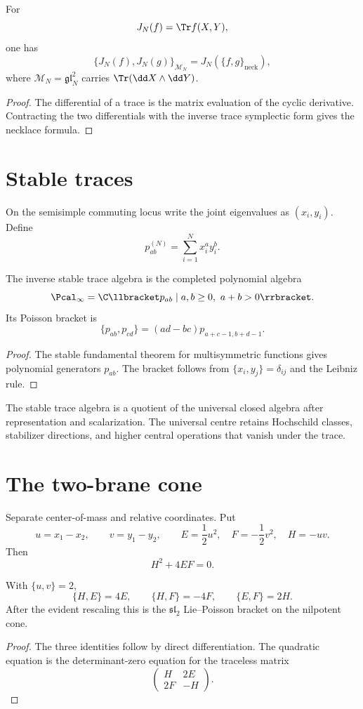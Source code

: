\begin{theorem}
For
\[
 J_N(f)=\Tr f(X,Y),
\]
one has
\[
 \{J_N(f),J_N(g)\}_{\mathcal M_N}
 =J_N\!\left(\{f,g\}_{\mathrm{neck}}\right),
\]
where $\mathcal M_N=\mathfrak{gl}_N^2$ carries $\Tr(\dd X\wedge\dd Y)$.
\end{theorem}
\begin{proof}
The differential of a trace is the matrix evaluation of the cyclic derivative.  Contracting the two differentials with the inverse trace symplectic form gives the necklace formula.
\end{proof}

\chapter{Stable traces}
On the semisimple commuting locus write the joint eigenvalues as $(x_i,y_i)$.  Define
\[
 p_{ab}^{(N)}=\sum_{i=1}^{N}x_i^ay_i^b.
\]

\begin{theorem}
The inverse stable trace algebra is the completed polynomial algebra
\[
 \Pcal_\infty=
 \C\llbracket p_{ab}\mid a,b\ge0,\ a+b>0\rrbracket.
\]
Its Poisson bracket is
\[
 \{p_{ab},p_{cd}\}
 =(ad-bc)p_{a+c-1,b+d-1}.
\]
\end{theorem}
\begin{proof}
The stable fundamental theorem for multisymmetric functions gives polynomial generators $p_{ab}$.  The bracket follows from $\{x_i,y_j\}=\delta_{ij}$ and the Leibniz rule.
\end{proof}

\begin{remark}
The stable trace algebra is a quotient of the universal closed algebra after representation and scalarization.  The universal centre retains Hochschild classes, stabilizer directions, and higher central operations that vanish under the trace.
\end{remark}

\chapter{The two-brane cone}
Separate center-of-mass and relative coordinates.  Put
\[
 u=x_1-x_2,
 \qquad
 v=y_1-y_2,
 \qquad
 E=\frac12u^2,
 \quad
 F=-\frac12v^2,
 \quad
 H=-uv.
\]
Then
\[
 H^2+4EF=0.
\]

\begin{proposition}
With $\{u,v\}=2$,
\[
 \{H,E\}=4E,
 \qquad
 \{H,F\}=-4F,
 \qquad
 \{E,F\}=2H.
\]
After the evident rescaling this is the $\mathfrak{sl}_2$ Lie--Poisson bracket on the nilpotent cone.
\end{proposition}
\begin{proof}
The three identities follow by direct differentiation.  The quadratic equation is the determinant-zero equation for the traceless matrix
\[
 \begin{pmatrix}H&2E\\2F&-H\end{pmatrix}.
\]
\end{proof}


